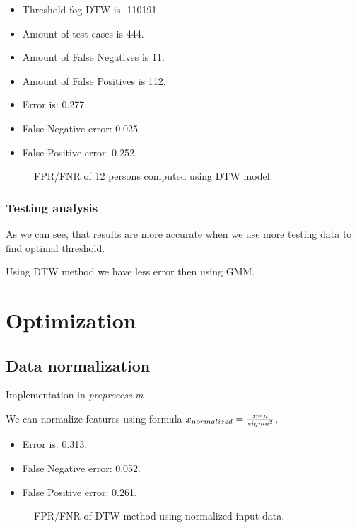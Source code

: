 \documentclass{article}
\begin{document}
\begin{itemize}
  \item Threshold fog DTW is -110191.
  \item Amount of test cases is 444.
  \item Amount of False Negatives is 11.
  \item Amount of False Positives is 112.
  \item Error is: 0.277.
  \item False Negative error: 0.025.
  \item False Positive error: 0.252.
\end{itemize}

\begin{figure}[htbp] 
  \centering
  \def\svgscale{0.7}
  
  \caption{FPR/FNR of 12 persons computed using DTW model.}
  \label{DTW_12persons}
\end{figure}

\newpage

\subsubsection{Testing analysis}
As we can see, that results are more accurate when we use more testing data to find optimal threshold.

Using DTW method we have less error then using GMM.

\section{Optimization}
\subsection{Data normalization}
Implementation in \textit{preprocess.m}

We can normalize features using formula \( x_{normalized}  = {x - \mu \over   sigma^2}\).

\begin{itemize}
  \item Error is: 0.313.
  \item False Negative error: 0.052.
  \item False Positive error: 0.261.
\end{itemize}

\begin{figure}[htbp] 
  \centering
  \def\svgscale{0.7}
  
  \caption{FPR/FNR of DTW method using normalized input data.}
  \label{DTW_normalization}
\end{figure}
\end{document}
